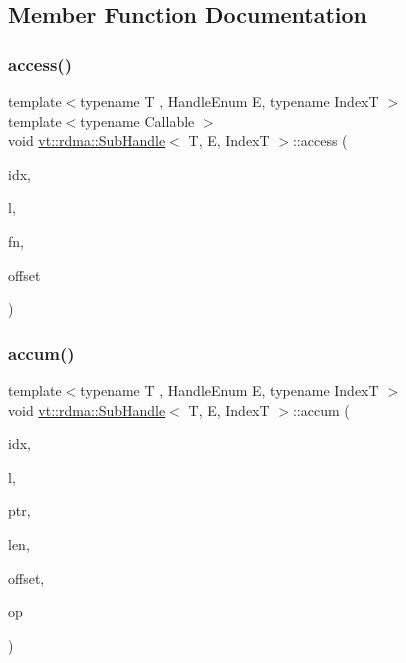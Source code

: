 \subsection{Member Function Documentation}
\mbox{\label{structvt_1_1rdma_1_1_sub_handle_a9773a9d0641613d9ebe10c4a93befd4b}} 
\subsubsection{\texorpdfstring{access()}{access()}}
{\footnotesize\ttfamily template$<$typename T , Handle\+Enum E, typename IndexT $>$ \\
template$<$typename Callable $>$ \\
void \hyperlink{structvt_1_1rdma_1_1_sub_handle}{vt\+::rdma\+::\+Sub\+Handle}$<$ T, E, IndexT $>$\+::access (\begin{DoxyParamCaption}\item[{IndexT}]{idx,  }\item[{\hyperlink{namespacevt_1_1rdma_ac5c20b41a653e520b6305d4d454ecb70}{Lock}}]{l,  }\item[{Callable}]{fn,  }\item[{uint64\+\_\+t}]{offset }\end{DoxyParamCaption})}

\mbox{\label{structvt_1_1rdma_1_1_sub_handle_ade8b9a06b32efd7533a4f626374cc6eb}} 
\subsubsection{\texorpdfstring{accum()}{accum()}}
{\footnotesize\ttfamily template$<$typename T , Handle\+Enum E, typename IndexT $>$ \\
void \hyperlink{structvt_1_1rdma_1_1_sub_handle}{vt\+::rdma\+::\+Sub\+Handle}$<$ T, E, IndexT $>$\+::accum (\begin{DoxyParamCaption}\item[{IndexT const \&}]{idx,  }\item[{\hyperlink{namespacevt_1_1rdma_ac5c20b41a653e520b6305d4d454ecb70}{Lock}}]{l,  }\item[{T $\ast$}]{ptr,  }\item[{uint64\+\_\+t}]{len,  }\item[{int}]{offset,  }\item[{M\+P\+I\+\_\+\+Op}]{op }\end{DoxyParamCaption})}

